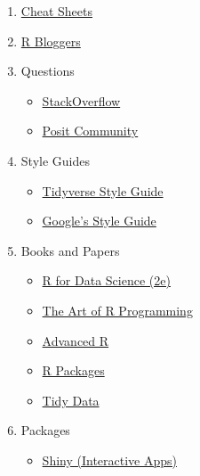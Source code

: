 \documentclass[
  letterpaper,
  DIV=11,
  numbers=noendperiod]{scrreprt}
\begin{document}
\begin{enumerate}
\def\labelenumi{\arabic{enumi}.}
\item
  \href{https://www.rstudio.com/resources/cheatsheets/}{Cheat Sheets}
\item
  \href{https://www.r-bloggers.com/}{R Bloggers}
\item
  Questions

  \begin{itemize}
  \item
    \href{https://stackoverflow.com}{StackOverflow}
  \item
    \href{https://community.rstudio.com/}{Posit Community}
  \end{itemize}
\item
  Style Guides

  \begin{itemize}
  \item
    \href{http://style.tidyverse.org/index.html}{Tidyverse Style Guide}
  \item
    \href{https://google.github.io/styleguide/Rguide.xml}{Google's Style
    Guide}
  \end{itemize}
\item
  Books and Papers

  \begin{itemize}
  \item
    \href{https://r4ds.hadley.nz/}{R for Data Science (2e)}
  \item
    \href{http://heather.cs.ucdavis.edu/~matloff/132/NSPpart.pdf}{The
    Art of R Programming}
  \item
    \href{http://adv-r.had.co.nz/}{Advanced R}
  \item
    \href{http://r-pkgs.had.co.nz/}{R Packages}
  \item
    \href{https://www.jstatsoft.org/article/view/v059i10}{Tidy Data}
  \end{itemize}
\item
  Packages

  \begin{itemize}
  \item
    \href{https://shiny.rstudio.com/}{Shiny (Interactive Apps)}


\end{itemize}
\end{enumerate}
\end{document}
